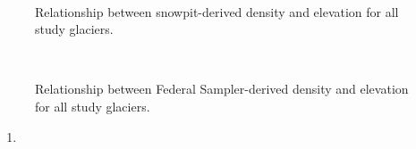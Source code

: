 \documentclass[12pt]{article}
\begin{document}
\begin{figure} 
	\centering
	\\
	\caption{Relationship between snowpit-derived density and elevation for all study glaciers.}
	\label{fig:elev_snowpit}
\end{figure}

\begin{figure} 
	\centering
	\\
	\caption{Relationship between Federal Sampler-derived density and elevation for all study glaciers.}
	\label{fig:elev_tube}
\end{figure}

\begin{enumerate}
\item 
\end{enumerate}
\end{document}
